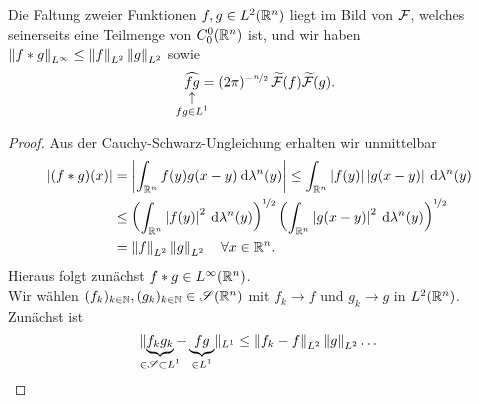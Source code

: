 \documentclass[skript.tex]{subfiles}
\begin{document}
	\begin{cor}
		Die Faltung zweier Funktionen $f,g \in L^2(\mathbb{R}^n)$ liegt im Bild von $\mathcal{F}$, welches seinerseits eine Teilmenge von $C_0^0(\mathbb{R}^n)$ ist, und wir haben $\left\lVert f \ast g \right\rVert_{L^\infty} \leq \left\lVert f \right\rVert_{L^2} \left\lVert g \right\rVert_{L^2}$ sowie
		\[
			\uarrow{fg \in L^1}{\wh{fg}} = (2\pi)^{-\nicefrac{n}{2}}\, \wt{\F}(f)\wt{\F}(g).
		\]
	\end{cor}
	\begin{proof}
		Aus der Cauchy-Schwarz-Ungleichung erhalten wir unmittelbar
		\begin{align*}
			\left| (f \ast g)(x) \right| &= \left| \int_{\mathbb{R}^n} f(y)g(x-y)\: \mathrm{d}\lambda^n(y) \right| \leq \int_{\mathbb{R}^n} \left| f(y) \right|\left| g(x-y) \right|\: \mathrm{d}\lambda^n(y) \\
			&\leq \left(\int_{\mathbb{R}^n} \left| f(y) \right|^2 \: \mathrm{d}\lambda^n(y)\right)^{\nicefrac{1}{2}} \left(\int_{\mathbb{R}^n} \left| g(x-y) \right|^2\: \mathrm{d}\lambda^n(y)\right)^{\nicefrac{1}{2}} \\
			&= \left\lVert f \right\rVert_{L^2} \left\lVert g \right\rVert_{L^2} \quad \forall x \in \mathbb{R}^n.
		\end{align*}
		Hieraus folgt zunächst $f \ast g \in L^\infty(\mathbb{R}^n)$.\\ %
		Wir wählen $(f_k)_{k\in\mathbb{N}},(g_k)_{k\in\mathbb{N}} \in \mathscr{S}(\mathbb{R}^n)$ mit $f_k \to f$ und $g_k \to g$ in $L^2(\mathbb{R}^n)$.
		Zunächst ist
		\[
			\lVert \underbrace{f_k g_k}_{\mathclap{\in \ms{S} \sbs L^1}}-\underbrace{fg}_{\mathclap{\in L^1}} \rVert_{L^1} \leq \norm{f_k-f}_{L^2} \norm{g}_{L^2} \dots %
		\]
			
	\end{proof}
\end{document}

